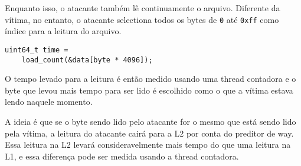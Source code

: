 \documentclass[twocolumn, 12pt]{article}
\begin{document}
Enquanto isso,
o atacante também lê continuamente o arquivo.
Diferente da vítima, no entanto,
o atacante selectiona todos os bytes de \texttt{0} até \texttt{0xff}
como índice para a leitura do arquivo.
\begin{verbatim}
uint64_t time =
	load_count(&data[byte * 4096]);
\end{verbatim}

O tempo levado para a leitura é então
medido usando uma thread contadora
e o byte que levou mais tempo
para ser lido é escolhido como
o que a vítima estava lendo
naquele momento.

A ideia é que se o byte
sendo lido pelo atacante
for o mesmo que está
sendo lido pela vítima,
a leitura do atacante
cairá para a L2 por conta do preditor de way.
Essa leitura na L2 levará
consideravelmente mais tempo
do que uma leitura na L1,
e essa diferença pode ser medida
usando a thread contadora.

\pagebreak
\printbibliography
\end{document}
